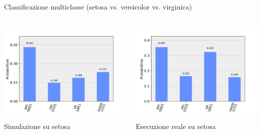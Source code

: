 \documentclass{beamer}
\begin{document}
    \begin{frame}{Classificazione multiclasse (setosa vs. versicolor vs. virginica)}
        \begin{columns}
            \begin{center}
                \includegraphics[width=\textwidth]{gfx/setosa_simulato_multiclasse.png}

                Simulazione su setosa
            \end{center}
            \begin{center}
                \includegraphics[width=\textwidth]{gfx/setosa_reale_20190913:1716.png}
                
                Esecuzione reale su setosa
            \end{center}
        \end{columns}
    \end{frame}
\end{document}
